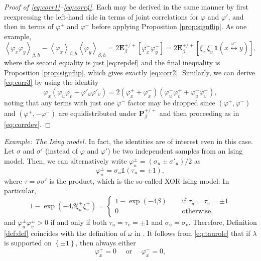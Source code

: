 \documentclass{article}
\numberwithin{equation}{section}
\theoremstyle{definition}
\theoremstyle{definition}
\theoremstyle{remark}
\newcommand{\E}{\mathbb{E}}
\newcommand\vp{\varphi}
\newcommand{\w}{\omega}
\renewcommand{\l}{\lambda}
\newcommand{\vpp}{\vp^+}
\newcommand{\vpm}{\vp^-}
\renewcommand{\P}{\mathrm{\mathbf{P}}}
\renewcommand{\E}{\mathrm{\mathbf{E}}}
\newcommand{\Lm}{\xi^-}
\renewcommand{\i}{\mathds{1}}
\begin{document}
\begin{proof}[Proof of \eqref{eq:corr1}--\eqref{eq:corr4}]
	Each may be derived in the same manner by first reexpressing the left-hand side in terms of joint correlations for $\vp$ and $\vp'$, and then in terms of $\vpp$ and $\vpm$ before applying Proposition \ref{prop:signflip}.
	As one example,
	\begin{equation}\label{eq:corrdev}
		\left< \vp_x \vp_y \right>_{\beta,h}^{} - \left< \vp_x \right>_{\beta,h}^{} \left< \vp_y \right>_{\beta,h}^{}  = 2\E^{+ / +}_\beta[ \vp^-_x \vp^-_y ] 
		= 2\E^{+ / +}_\beta[ \Lm_x\Lm_y \i(x \overset{\w^-}{\longleftrightarrow} y) ],
	\end{equation}
	where the second equality is just \eqref{eq:repdef} and the final inequality is Proposition \ref{prop:signflip}, which gives exactly \eqref{eq:corr2}. Similarly, we can derive \eqref{eq:corr3} by using the identity
	\[
		\vp_x( \vp_u \vp_v - \vp'_u\vp'_v) = 2(\vpp_x + \vpm_x)(\vpm_u\vpp_v + \vpp_u\vpm_v),
	\]
	noting that any terms with just one $\vpm$ factor may be dropped since $(\vpp,\vpm)$ and $(\vpp,-\vpm)$ are equidistributed under $\P^{+ / +}_\beta$ and then proceeding as in \eqref{eq:corrdev}. 
\end{proof}
\noindent\emph{Example: The Ising model.} In fact, the identities are of interest even in this case. 
Let $\sigma$ and $\sigma'$ (instead of $\vp$ and $\vp'$) be two independent samples from an Ising model. Then, we can alternatively write $\vp^\pm_u = (\sigma_u \pm \sigma'_u) / 2$ as
\begin{equation}\label{eq:taurole}
\vp^\pm_u = \sigma_u \i( \tau_u = \pm 1), 
\end{equation} 
where $\tau = \sigma \sigma'$ is the product, which is the so-called XOR-Ising model. In particular,
\[
1 - \exp(-4\beta \xi^\pm_u \xi^\pm_v) = \begin{cases}
	1 - \exp(-4\beta) \quad & \text{ if }\tau_u = \tau_v = \pm 1\\
	0 \quad & \text{ otherwise,}
\end{cases}
\]
and $\vp^\pm_u\vp^\pm_v > 0$ if and only if both $\tau_u = \tau_v = \pm 1$ and $\sigma_u = \sigma_v$.
Therefore, Definition \ref{def:def} coincides with the definition of $\w$ in \cite[Definition 2.6]{AHL}.
It follows from \eqref{eq:taurole} that if $\l$ is supported on $\left\{ \pm 1 \right\}$, then always either
\begin{equation}\label{eq:isingext}
	\vp^+_x = 0 \quad \text{ or }\quad \vp^-_x = 0,
\end{equation} 
\end{document}
